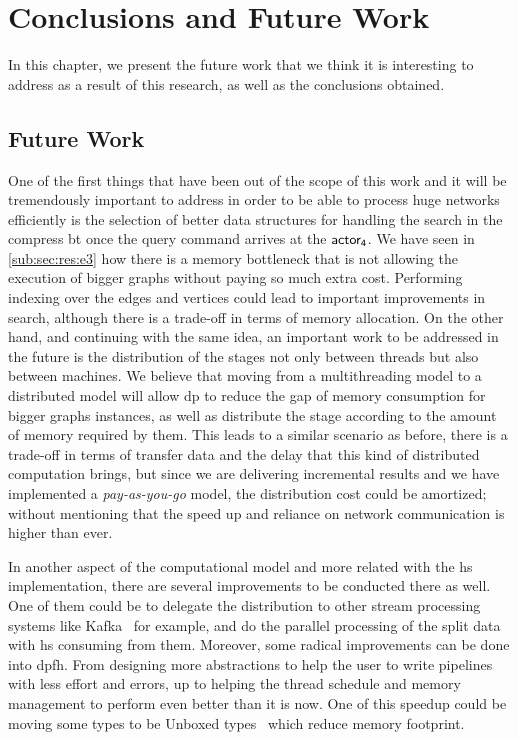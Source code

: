 \chapter{Conclusions and Future Work}\label{conclusions}
In this chapter, we present the future work that we think it is interesting to address as a result of this research, 
as well as the conclusions obtained.

\section{Future Work}
One of the first things that have been out of the scope of this work and it will be tremendously important to address in order to be able to process huge networks efficiently is 
the selection of better data structures for handling the search in the compress \acrshort{bt} once the query command arrives at the $\mathsf{actor_4}$.
We have seen in \autoref{sub:sec:res:e3} how there is a memory bottleneck that is not allowing the execution of bigger graphs without paying so much extra cost. 
Performing indexing over the edges and vertices could lead to important improvements in search, although there is a trade-off in terms of memory allocation.
On the other hand, and continuing with the same idea, an important work to be addressed in the future is the distribution of the stages not only between threads but also between machines. 
We believe that moving from a multithreading model to a distributed model will allow \acrlong{dp} to reduce the gap of memory consumption for bigger graphs instances, as well as distribute the stage according to the amount of memory required by them. 
This leads to a similar scenario as before, there is a trade-off in terms of transfer data and the delay that this kind of distributed computation brings, but 
since we are delivering incremental results and we have implemented a \emph{pay-as-you-go} model, the distribution cost could be amortized; without mentioning that the speed up and reliance on network communication is higher than ever.

In another aspect of the computational model and more related with the \acrlong{hs} implementation, there are several improvements to be conducted there as well. One of them could be
to delegate the distribution to other stream processing systems like Kafka~\cite{kafka} for example, and do the parallel processing of the split data with \acrshort{hs} consuming from them.
Moreover, some radical improvements can be done into \acrshort{dpfh}. From designing more abstractions to help the user to write pipelines with less effort and errors, up to helping the thread schedule and memory management to perform even better than it is now. 
One of this speedup could be moving some types to be Unboxed types~\cite{hs-unbox} which reduce memory footprint.

